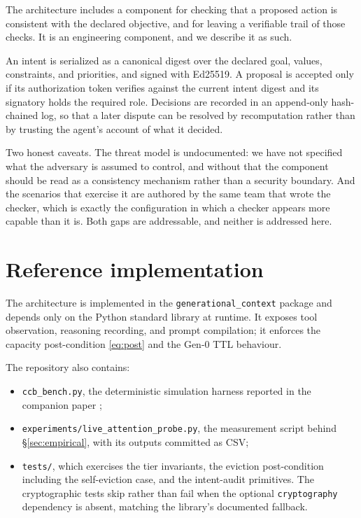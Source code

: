 \documentclass[11pt,a4paper]{article}
\theoremstyle{plain}
\theoremstyle{definition}
\theoremstyle{remark}
\begin{document}
The architecture includes a component for checking that a proposed action is
consistent with the declared objective, and for leaving a verifiable trail of
those checks. It is an engineering component, and we describe it as such.

An intent is serialized as a canonical digest over the declared goal, values,
constraints, and priorities, and signed with Ed25519. A proposal is accepted only
if its authorization token verifies against the current intent digest and its
signatory holds the required role. Decisions are recorded in an append-only
hash-chained log, so that a later dispute can be resolved by recomputation
rather than by trusting the agent's account of what it decided.

Two honest caveats. The threat model is undocumented: we have not specified what
the adversary is assumed to control, and without that the component should be
read as a consistency mechanism rather than a security boundary. And the
scenarios that exercise it are authored by the same team that wrote the checker,
which is exactly the configuration in which a checker appears more capable than
it is. Both gaps are addressable, and neither is addressed here.

\section{Reference implementation}
\label{sec:impl}

The architecture is implemented in the \texttt{generational\_context} package
and depends only on the Python standard library at runtime. It exposes tool
observation, reasoning recording, and prompt compilation; it enforces the
capacity post-condition \eqref{eq:post} and the Gen-0 TTL behaviour.

The repository also contains:

\begin{itemize}[leftmargin=*]
  \item \texttt{ccb\_bench.py}, the deterministic simulation harness reported in
        the companion paper \cite{sanyal2026softmax};
  \item \texttt{experiments/live\_attention\_probe.py}, the measurement script
        behind \S\ref{sec:empirical}, with its outputs committed as CSV;
  \item \texttt{tests/}, which exercises the tier invariants, the eviction
        post-condition including the self-eviction case, and the intent-audit
        primitives. The cryptographic tests skip rather than fail when the
        optional \texttt{cryptography} dependency is absent, matching the
        library's documented fallback.
\end{itemize}
\end{document}

